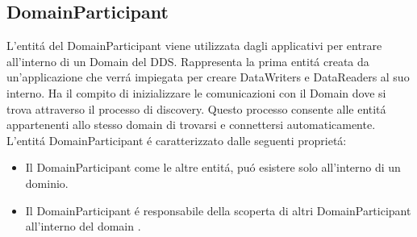
\subsection{DomainParticipant}
L'entitá del DomainParticipant viene utilizzata dagli applicativi
per entrare all'interno di un Domain del DDS. 
Rappresenta la prima entitá creata da un'applicazione che verrá 
impiegata per creare DataWriters e DataReaders
al suo interno. Ha il compito di inizializzare
le comunicazioni con il Domain dove si trova attraverso 
il processo di discovery.
Questo processo consente alle entitá appartenenti allo 
stesso domain di trovarsi e connettersi automaticamente.
L'entitá DomainParticipant é caratterizzato dalle seguenti proprietá:
\begin{itemize}
    \item Il DomainParticipant come le altre entitá, puó 
    esistere solo all'interno di un dominio.
    \item Il DomainParticipant é responsabile della scoperta di altri
    DomainParticipant all'interno del domain \cite{domainparticipantrti}.
\end{itemize}



